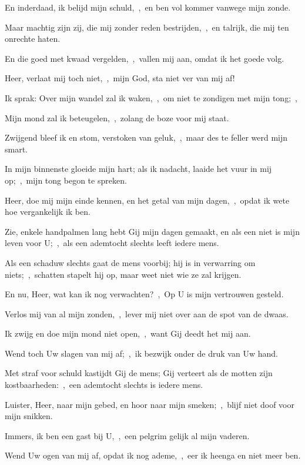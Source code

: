 \documentclass[12pt,twoside,a5paper]{article}
\begin{document}
\begin{halfparskip}
  En inderdaad, ik belijd mijn schuld,~\sep\ en ben vol kommer vanwege mijn zonde.

  Maar machtig zijn zij, die mij zonder reden bestrijden,~\sep\ en talrijk, die mij ten onrechte haten.

  En die goed met kwaad vergelden,~\sep\ vallen mij aan, omdat ik het goede volg.

  Heer, verlaat mij toch niet,~\sep\ mijn God, sta niet ver van mij af!

   Ik sprak: Over mijn wandel zal ik waken,~\sep\ om niet te zondigen met mijn tong;~\sep

  Mijn mond zal ik beteugelen,~\sep\ zolang de boze voor mij staat.

  Zwijgend bleef ik en stom, verstoken van geluk,~\sep\ maar des te feller werd mijn smart.

  In mijn binnenste gloeide mijn hart; als ik nadacht, laaide het vuur in mij op;~\sep\ mijn tong begon te spreken.

  Heer, doe mij mijn einde kennen, en het getal van mijn dagen,~\sep\ opdat ik wete hoe vergankelijk ik ben.

  Zie, enkele handpalmen lang hebt Gij mijn dagen gemaakt, en als een niet is mijn leven voor U;~\sep\ als een ademtocht slechts leeft iedere mens.

  Als een schaduw slechts gaat de mens voorbij; hij is in verwarring om niets;~\sep\ schatten stapelt hij op, maar weet niet wie ze zal krijgen.

  En nu, Heer, wat kan ik nog verwachten?~\sep\ Op U is mijn vertrouwen gesteld.

  Verlos mij van al mijn zonden,~\sep\ lever mij niet over aan de spot van de dwaas.

  Ik zwijg en doe mijn mond niet open,~\sep\ want Gij deedt het mij aan.

  Wend toch Uw slagen van mij af;~\sep\ ik bezwijk onder de druk van Uw hand.

  Met straf voor schuld kastijdt Gij de mens; Gij verteert als de motten zijn kostbaarheden:~\sep\ een ademtocht slechts is iedere mens.

  Luister, Heer, naar mijn gebed, en hoor naar mijn smeken;~\sep\ blijf niet doof voor mijn snikken.

  Immers, ik ben een gast bij U,~\sep\ een pelgrim gelijk al mijn vaderen.

  Wend Uw ogen van mij af, opdat ik nog ademe,~\sep\ eer ik heenga en niet meer ben.


\end{halfparskip}
\end{document}

